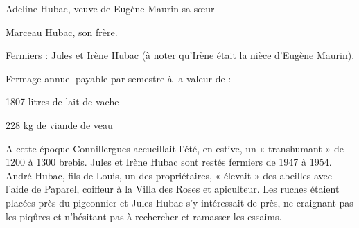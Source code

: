 \hspace{3.5cm} Adeline Hubac, veuve de Eugène Maurin sa sœur

\hspace{3.5cm} Marceau Hubac, son frère.

\underline{Fermiers} : Jules et Irène Hubac (à noter qu’Irène était la nièce d’Eugène Maurin).

\vspace{0.2cm}

Fermage annuel payable par semestre à la valeur de :

\hspace{3.5cm} 1807 litres de lait de vache

\hspace{3.5cm} 228 kg de viande de veau

A cette époque Connillergues accueillait l’été, en estive, un « transhumant » de 1200 à 1300
brebis. Jules et Irène Hubac sont restés fermiers de 1947 à 1954.
André Hubac, fils de Louis, un des propriétaires, « élevait » des abeilles avec l’aide de
Paparel, coiffeur à la Villa des Roses et apiculteur. Les ruches étaient placées près du
pigeonnier et Jules Hubac s’y intéressait de près, ne craignant pas les piqûres et n’hésitant pas
à rechercher et ramasser les essaims.
